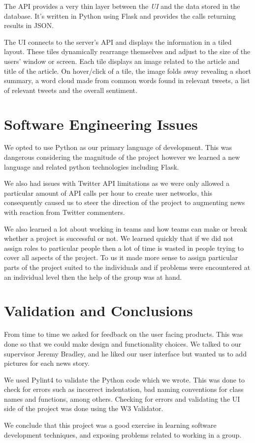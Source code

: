 \documentclass[a4paper,12pt]{article}
\begin{document}
	 The API provides a very thin layer between the \emph{UI} and the data stored in the database. It's written in Python using Flask and provides the calls returning results in JSON.
	 
	 The UI connects to the server's API and displays the information in a tiled layout. These tiles dynamically rearrange themselves and adjust to the size of the users' window or screen. Each tile displays an image related to the article and title of the article. On hover/click of a tile, the image folds away revealing a short summary, a word cloud made from common words found in relevant tweets, a list of relevant tweets and the overall sentiment.
  
  \section{Software Engineering Issues}
  
  We opted to use Python as our primary language of development. This was dangerous considering the magnitude of the project however we learned a new language and related python technologies including Flask.
  
  We also had issues with Twitter API limitations as we were only allowed a particular amount of API calls per hour to create user networks, this consequently caused us to steer the direction of the project to augmenting news with reaction from Twitter commenters.
  
  We also learned a lot about working in teams and how teams can make or break whether a project is successful or not. We learned quickly that if we did not assign roles to particular people then a lot of time is wasted in people trying to cover all aspects of the project. To us it made more sense to assign particular parts of the project suited to the individuals and if problems were encountered at an individual level then the help of the group was at hand.
  
  \section{Validation and Conclusions}
  
	From time to time we asked for feedback on the user facing products. This was done so that we could make design and functionality choices. We talked to our supervisor Jeremy Bradley, and he liked our user interface but wanted us to add pictures for each news story.
	
	We used Pylint4 to validate the Python code which we wrote. This was done to check for errors such as incorrect indentation, bad naming conventions for class names and functions, among others. Checking for errors and validating the UI side of the project was done using the W3 Validator.
	
	We conclude that this project was a good exercise in learning software development techniques, and exposing problems related to working in a group.
  
\end{document}
